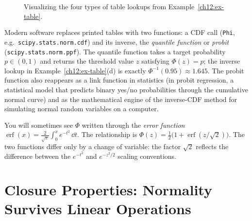 \begin{example}
\begin{figure}[H]
\caption{Visualizing the four types of table lookups from Example~\ref{ch12:ex-table}.}
\label{ch12:fig-lookups}
\end{figure}
\end{example}

\begin{connectionbox}
Modern software replaces printed tables with two functions: a CDF call
(\texttt{Phi}, e.g.\ \texttt{scipy.stats.norm.cdf}) and its inverse, the
\emph{quantile function} or \emph{probit} (\texttt{scipy.stats.norm.ppf}). The
quantile function takes a target probability $p \in (0,1)$ and returns the
threshold value $z$ satisfying $\Phi(z) = p$; the inverse lookup in
Example~\ref{ch12:ex-table}(d) is exactly $\Phi^{-1}(0.95) \approx 1.645$. The
probit function also reappears as a link function in statistics (in probit
regression, a statistical model that predicts binary yes/no probabilities
through the cumulative normal curve) and as the mathematical engine of the
inverse-CDF method for simulating normal random variables on a computer.
\end{connectionbox}

\begin{remark}
\label{ch12:erf}
You will sometimes see $\Phi$ written through the \emph{error function}
$\operatorname{erf}(x) = \frac{2}{\sqrt{\pi}}\int_0^x e^{-t^2}\,\dd t$. The
relationship is $\Phi(z) = \tfrac{1}{2}\big(1 + \operatorname{erf}(z/\sqrt{2})\big)$.
The two functions differ only by a change of variable: the factor $\sqrt{2}$
reflects the difference between the $e^{-t^2}$ and $e^{-z^2/2}$ scaling conventions.
\end{remark}

\section{Closure Properties: Normality Survives Linear Operations}
\label{ch12:closure}

